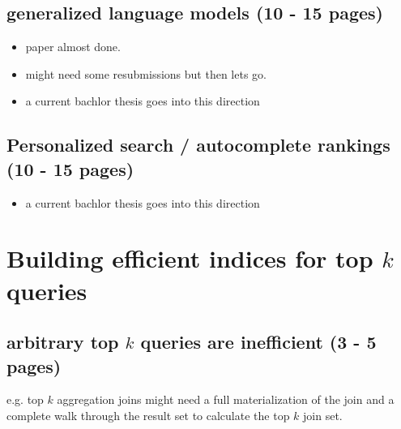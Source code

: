 \documentclass[•]{book}
\begin{document}
\chapter{generalized language models (10 - 15 pages)}
\begin{itemize}
\item paper almost done. 
\item might need some resubmissions but then lets go.
\item a current bachlor thesis goes into this direction
\end{itemize}

\chapter{Personalized search / autocomplete rankings (10 - 15 pages)}
\begin{itemize}
\item a current bachlor thesis goes into this direction
\end {itemize}


\part{Building efficient indices for top $k$ queries}
\chapter{arbitrary top $k$ queries are inefficient (3 - 5 pages)}
e.g. top $k$ aggregation joins might need a full materialization of the join and a complete walk through the result set to calculate the top $k$ join set. 
\end{document}
